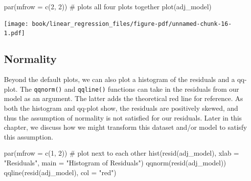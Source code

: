 \documentclass[
  letterpaper,
]{latex/krantz}
\makeatletter
\newenvironment{Shaded}{\begin{snugshade}}{\end{snugshade}}
\newcommand{\AttributeTok}[1]{\textcolor[rgb]{0.40,0.45,0.13}{#1}}
\newcommand{\CommentTok}[1]{\textcolor[rgb]{0.37,0.37,0.37}{#1}}
\newcommand{\DecValTok}[1]{\textcolor[rgb]{0.68,0.00,0.00}{#1}}
\newcommand{\FunctionTok}[1]{\textcolor[rgb]{0.28,0.35,0.67}{#1}}
\newcommand{\NormalTok}[1]{\textcolor[rgb]{0.00,0.23,0.31}{#1}}
\newcommand{\StringTok}[1]{\textcolor[rgb]{0.13,0.47,0.30}{#1}}
\newenvironment{kframe}{%
\medskip{}
\setlength{\fboxsep}{.8em}
 \def\at@end@of@kframe{}%
 \ifinner\ifhmode%
  \def\at@end@of@kframe{\end{minipage}}%
  \begin{minipage}{\columnwidth}%
 \fi\fi%
 \def\FrameCommand##1{\hskip\@totalleftmargin \hskip-\fboxsep
 \colorbox{shadecolor}{##1}\hskip-\fboxsep
     \hskip-\linewidth \hskip-\@totalleftmargin \hskip\columnwidth}%
 \MakeFramed {\advance\hsize-\width
   \@totalleftmargin\z@ \linewidth\hsize
   \@setminipage}}%
 {\par\unskip\endMakeFramed%
 \at@end@of@kframe}
\renewenvironment{Shaded}{\begin{kframe}}{\end{kframe}}
\makeatother
\begin{document}
\begin{Shaded}
\begin{Highlighting}[]
\FunctionTok{par}\NormalTok{(}\AttributeTok{mfrow =} \FunctionTok{c}\NormalTok{(}\DecValTok{2}\NormalTok{, }\DecValTok{2}\NormalTok{)) }\CommentTok{\# plots all four plots together}
\FunctionTok{plot}\NormalTok{(adj\_model)}
\end{Highlighting}
\end{Shaded}

\begin{center}
\texttt{[image: book/linear\_regression\_files/figure-pdf/unnamed-chunk-16-1.pdf]}
\end{center}

\subsection{Normality}\label{normality}

Beyond the default plots, we can also plot a histogram of the residuals
and a qq-plot. The
\texttt{qqnorm()} and
\texttt{qqline()}
functions can take in the residuals from our model as an argument. The
latter adds the theoretical red line for reference. As both the
histogram and qq-plot show, the residuals are positively skewed, and
thus the assumption of normality is not satisfied for our residuals.
Later in this chapter, we discuss how we might transform this dataset
and/or model to satisfy this assumption.

\begin{Shaded}
\begin{Highlighting}[]
\FunctionTok{par}\NormalTok{(}\AttributeTok{mfrow =} \FunctionTok{c}\NormalTok{(}\DecValTok{1}\NormalTok{, }\DecValTok{2}\NormalTok{)) }\CommentTok{\# plot next to each other}
\FunctionTok{hist}\NormalTok{(}\FunctionTok{resid}\NormalTok{(adj\_model), }\AttributeTok{xlab =} \StringTok{"Residuals"}\NormalTok{, }
     \AttributeTok{main =} \StringTok{"Histogram of Residuals"}\NormalTok{) }
\FunctionTok{qqnorm}\NormalTok{(}\FunctionTok{resid}\NormalTok{(adj\_model))}
\FunctionTok{qqline}\NormalTok{(}\FunctionTok{resid}\NormalTok{(adj\_model), }\AttributeTok{col =} \StringTok{"red"}\NormalTok{) }
\end{Highlighting}
\end{Shaded}
\end{document}
